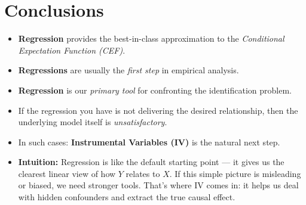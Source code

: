 \documentclass[12pt]{article}
\begin{document}
\section*{Conclusions}

\begin{itemize}
    \item \textbf{Regression} provides the best-in-class approximation to the \textit{Conditional Expectation Function (CEF)}.  
    \item \textbf{Regressions} are usually the \textit{first step} in empirical analysis.  
    \item \textbf{Regression} is our \textit{primary tool} for confronting the identification problem.  
    \item If the regression you have is not delivering the desired relationship, then the underlying model itself is \textit{unsatisfactory}.  
    \item In such cases: \textbf{Instrumental Variables (IV)} is the natural next step.  
\end{itemize}

\begin{itemize}
    \item \textbf{Intuition:} Regression is like the default starting point — it gives us the clearest linear view of how $Y$ relates to $X$. If this simple picture is misleading or biased, we need stronger tools. That’s where IV comes in: it helps us deal with hidden confounders and extract the true causal effect.  
\end{itemize}
\end{document}
